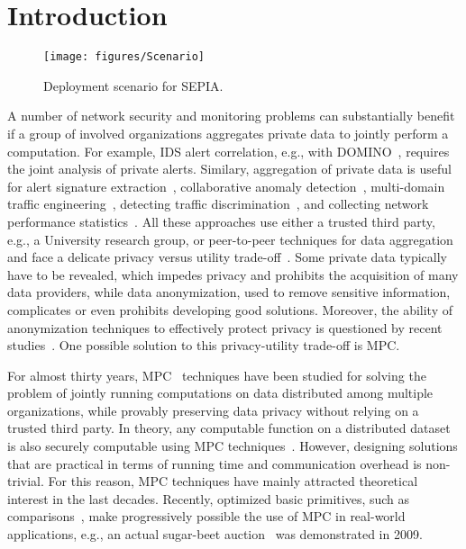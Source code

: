 \documentclass[letterpaper,11pt,onecolumn,titlepage]{article}
\begin{document}
\section{Introduction}
\label{sec:intro}

\begin{figure}[t]
	\centering
	\texttt{[image: figures/Scenario]}
	\caption{Deployment scenario for SEPIA.}
	\label{fig:scenario}
\end{figure}



A number of network security and monitoring problems can substantially
benefit if a group of involved organizations aggregates private data
to jointly perform a computation. For example, IDS alert correlation,
e.g., with DOMINO~\cite{yegneswaran2004gid}, requires the joint
analysis of private alerts. Similary, aggregation of private data is
useful for alert signature extraction~\cite{janak2006}, collaborative
anomaly detection~\cite{ringberg2009}, multi-domain traffic
engineering~\cite{Machi2004}, detecting traffic
discrimination~\cite{tariq2009}, and collecting network performance
statistics~\cite{Simpson2004}. All these approaches use either a
trusted third party, e.g., a University research group, or
peer-to-peer techniques for data aggregation and face a delicate
privacy versus utility trade-off~\cite{porras2006lcs}. 
Some private data typically have to be revealed, which impedes privacy and
prohibits the acquisition of many data providers, while data anonymization,
used to remove sensitive information, complicates or even prohibits
developing good solutions.  
Moreover, the ability of anonymization techniques to effectively protect privacy is questioned by recent
studies~\cite{Ohm2010}. One possible solution to this privacy-utility trade-off is MPC.

For almost thirty years, MPC~\cite{yao1982psc} techniques have been studied for
solving the problem of jointly running computations on data
distributed among multiple organizations, while provably preserving
data privacy without relying on a trusted third party. In theory, any
computable function on a distributed dataset is also securely
computable using MPC techniques~\cite{Goldreich1987any}. However, designing 
solutions that are practical in terms of running time and
communication overhead is non-trivial. For this reason, MPC techniques have mainly
attracted theoretical interest in the last decades. Recently,
optimized basic primitives, such as
comparisons~\cite{damgard2006bitdecomp,nishide2007nobitdecomp}, make
progressively possible the use of MPC in real-world applications,
e.g., an actual sugar-beet auction~\cite{bogetoft2009secure} was
demonstrated in 2009.
\end{document}
